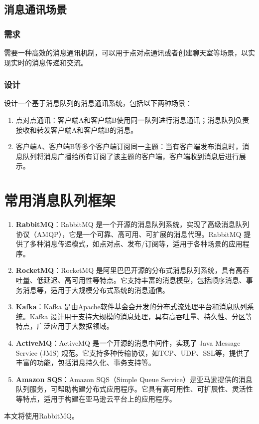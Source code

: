 \documentclass[11pt, a4paper, oneside]{ctexbook}
\begin{document}
\subsection{消息通讯场景}
\subsubsection{需求}
需要一种高效的消息通讯机制，可以用于点对点通讯或者创建聊天室等场景，以实现实时的消息传递和交流。

\subsubsection{设计}
设计一个基于消息队列的消息通讯系统，包括以下两种场景：
\begin{enumerate}
  \item 点对点通讯：客户端A和客户端B使用同一队列进行消息通讯；消息队列负责接收和转发客户端A和客户端B的消息。
  \item 客户端A、客户端B等多个客户端订阅同一主题：当有客户端发布消息时，消息队列将消息广播给所有订阅了该主题的客户端，客户端收到消息后进行展示。
\end{enumerate}

\section{常用消息队列框架}
\begin{enumerate}
  \item \textbf{RabbitMQ}：RabbitMQ 是一个开源的消息队列系统，实现了高级消息队列协议（AMQP），它是一个可靠、高可用、可扩展的消息代理。RabbitMQ 提供了多种消息传递模式，如点对点、发布/订阅等，适用于各种场景的应用程序。
  \item \textbf{RocketMQ}：RocketMQ 是阿里巴巴开源的分布式消息队列系统，具有高吞吐量、低延迟、高可用性等特点。它支持丰富的消息模型，包括顺序消息、事务消息等，适用于大规模分布式系统的消息通信。
  \item \textbf{Kafka}：Kafka 是由Apache软件基金会开发的分布式流处理平台和消息队列系统。Kafka 设计用于支持大规模的消息处理，具有高吞吐量、持久性、分区等特点，广泛应用于大数据领域。
  \item \textbf{ActiveMQ}：ActiveMQ 是一个开源的消息中间件，实现了 Java Message Service (JMS) 规范。它支持多种传输协议，如TCP、UDP、SSL等，提供了丰富的功能，包括消息持久化、事务支持等。
  \item \textbf{Amazon SQS}：Amazon SQS（Simple Queue Service）是亚马逊提供的消息队列服务，可帮助构建分布式应用程序。它具有高可用性、可扩展性、灵活性等特点，适用于构建在亚马逊云平台上的应用程序。
\end{enumerate}
本文将使用RabbitMQ。
\end{document}
